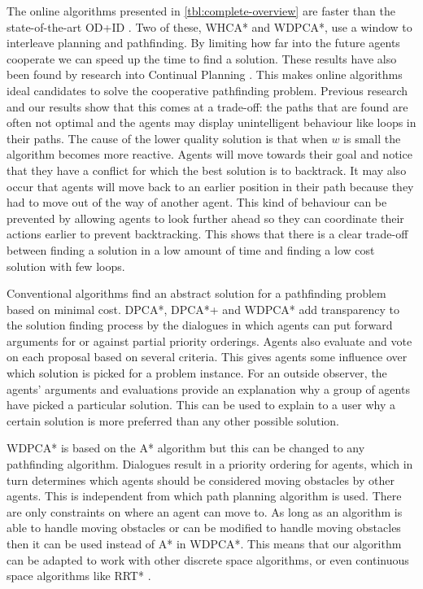 The online algorithms presented in \autoref{tbl:complete-overview} are faster 
than the state-of-the-art OD+ID \cite{standley2010,wei2016}. Two of these, 
WHCA* and WDPCA*, use a window to interleave planning and pathfinding. By 
limiting how far into the future agents cooperate we can speed up the time to 
find a solution. These results have also been found by research into Continual 
Planning \cite{brenner2009}. This makes online algorithms ideal candidates to 
solve the cooperative pathfinding problem. Previous research and our results 
show that this comes at a trade-off: the paths that are found are often not 
optimal and the agents may display unintelligent behaviour like loops in their 
paths. The cause of the lower quality solution is that when $w$ is small the 
algorithm becomes more reactive. Agents will move towards their goal and notice 
that they have a conflict for which the best solution is to backtrack. It may 
also occur that agents will move back to an earlier position in their path 
because they had to move out of the way of another agent. This kind of 
behaviour can be 
prevented by allowing agents to look further ahead so they can coordinate their 
actions earlier to prevent backtracking. This shows that there is a clear 
trade-off between finding a solution in a low amount of time and finding a low 
cost solution with few loops.

Conventional algorithms find an abstract solution for a pathfinding problem 
based on minimal cost. DPCA*, DPCA*+ and WDPCA* add transparency to the 
solution finding process by the dialogues in which agents can put forward 
arguments for or against partial priority orderings. Agents also evaluate and 
vote on each proposal based on several criteria. This gives agents some 
influence over which solution is picked for a problem instance. For an outside 
observer, the agents' arguments and evaluations provide an explanation why a 
group of agents have picked a particular solution. This can be used to explain 
to a user why a certain solution is more preferred than any other possible 
solution.

WDPCA* is based on the A* algorithm \cite{hart1968} but this can be changed to
any pathfinding algorithm. Dialogues result in a priority ordering for agents,
which in turn determines which agents should be considered moving obstacles by
other agents. This is independent from which path planning algorithm is used.
There are only constraints on where an agent can move to. As long as an
algorithm
is able to handle moving obstacles or can be modified to handle moving
obstacles then it can be used instead of A* in WDPCA*. This means that our
algorithm can be adapted to work with other discrete space algorithms, or even
continuous space algorithms like RRT* \cite{lavalle1998,lavalle2001,cap2013}.


